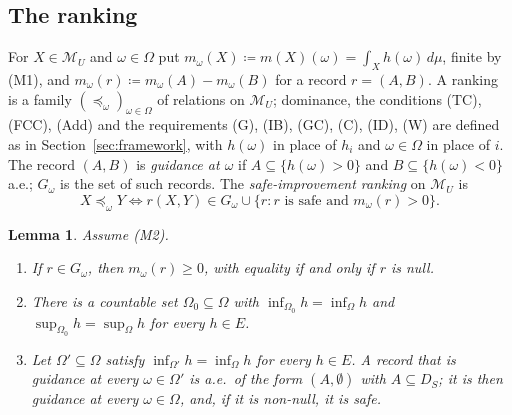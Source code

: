 \documentclass[11pt]{article}
\newcommand{\M}{\mathcal{M}}
\theoremstyle{plain}
\newtheorem{lemma}[theorem]{Lemma}
\theoremstyle{definition}
\theoremstyle{remark}
\begin{document}
\subsection{The ranking}\label{subsec:inf-ranking}

For $X\in\M_U$ and $\omega\in\Omega$ put $m_\omega(X)\coloneqq m(X)(\omega)=\int_X
h(\omega)\,d\mu$, finite by (M1), and $m_\omega(r)\coloneqq m_\omega(A)-m_\omega(B)$ for a
record $r=(A,B)$. A ranking is a family $(\preceq_\omega)_{\omega\in\Omega}$ of relations
on $\M_U$; dominance, the conditions (TC), (FCC), (Add) and the requirements (G), (IB),
(GC), (C), (ID), (W) are defined as in Section~\ref{sec:framework}, with $h(\omega)$ in
place of $h_i$ and $\omega\in\Omega$ in place of $i$. The record $(A,B)$ is
\emph{guidance at $\omega$} if $A\subseteq\{h(\omega)>0\}$ and $B\subseteq\{h(\omega)<0\}$
a.e.; $G_\omega$ is the set of such records. The \emph{safe-improvement ranking} on $\M_U$
is
\[
  X\preceq_\omega Y\iff r(X,Y)\in G_\omega\cup\{r:r\text{ is safe and }m_\omega(r)>0\}.
\]

\begin{lemma}\label{lem:normingE}
Assume (M2).
\begin{enumerate}[label=(\alph*)]
  \item If $r\in G_\omega$, then $m_\omega(r)\ge0$, with equality if and only if $r$ is
  null.
  \item There is a countable set $\Omega_0\subseteq\Omega$ with $\inf_{\Omega_0}h=
  \inf_\Omega h$ and $\sup_{\Omega_0}h=\sup_\Omega h$ for every $h\in E$.
  \item Let $\Omega'\subseteq\Omega$ satisfy $\inf_{\Omega'}h=\inf_\Omega h$ for every
  $h\in E$. A record that is guidance at every $\omega\in\Omega'$ is a.e.\ of the form
  $(A,\emptyset)$ with $A\subseteq D_S$; it is then guidance at every $\omega\in\Omega$,
  and, if it is non-null, it is safe.
\end{enumerate}
\end{lemma}
\end{document}
